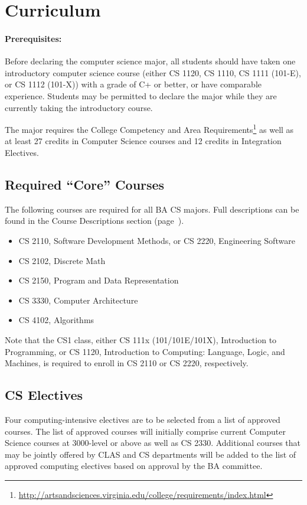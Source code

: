 \documentclass[10pt,letter]{book}
\newenvironment{itemlist}{
\begin{itemize}
\setlength{\itemsep}{0pt}
\setlength{\parskip}{0pt}}
{\end{itemize}}
\newcommand{\mysection}[1]{\section{#1}\renewcommand{\rightmark}{#1}}
\newcommand{\myurl}[1]{\footnote{\scriptsize\url{#1}}}
\begin{document}
\mysection{Curriculum}

\paragraph{Prerequisites:}

Before declaring the computer science major, all students should have
taken one introductory computer science course (either CS 1120,
CS 1110, CS 1111 (101-E), or CS 1112 (101-X)) with a grade of C+
or better, or have comparable experience. Students may be permitted to
declare the major while they are currently taking the introductory
course.

The major requires the College Competency and Area
Requirements\myurl{http://artsandsciences.virginia.edu/college/requirements/index.html}
as well as at least 27 credits in Computer Science courses and 12
credits in Integration Electives.

\subsection{Required ``Core'' Courses}

The following courses are required for all BA CS majors.  Full
descriptions can be found in the Course Descriptions section
(page~\pageref{sec:coursedesc}).

\begin{itemlist}
\item CS 2110, Software Development Methods, or CS 2220,
  Engineering Software
\item CS 2102, Discrete Math
\item CS 2150, Program and Data Representation
\item CS 3330, Computer Architecture
\item CS 4102, Algorithms
\end{itemlist}

Note that the CS1 class, either CS 111x (101/101E/101X), Introduction
to Programming, or CS 1120, Introduction to Computing: Language,
Logic, and Machines, is required to enroll in CS 2110 or CS
2220, respectively.

\subsection{CS Electives}

Four computing-intensive electives are to be selected from a list of
approved courses. The list of approved courses will initially comprise
current Computer Science courses at 3000-level or above as well as CS
2330. Additional courses that may be jointly offered by CLAS and CS
departments will be added to the list of approved computing electives
based on approval by the BA committee.
\end{document}
